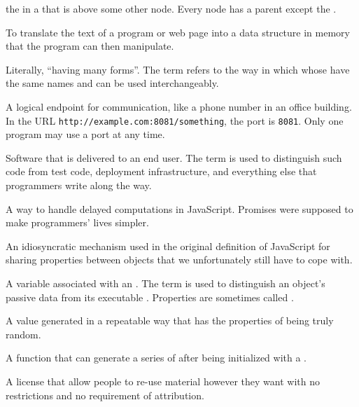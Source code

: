 \begin{description}
the  in a  that is above some other node. Every
node has a parent except the .

To translate the text of a program or web page into a data structure in memory
that the program can then manipulate.

Literally, ``having many forms''. The term refers to the way in which
 whose  have the same names and
 can be used interchangeably.

A logical endpoint for communication, like a phone number in an office
building. In the URL \texttt{http://example.com:8081/something}, the port is \texttt{8081}.
Only one program may use a port at any time.

Software that is delivered to an end user. The term is used to distinguish
such code from test code, deployment infrastructure, and everything else that
programmers write along the way.

A way to handle delayed computations in JavaScript. Promises were supposed to
make programmers' lives simpler.

An idiosyncratic mechanism used in the original definition of JavaScript for
sharing properties between objects that we unfortunately still have to cope
with.

A variable associated with an . The term is used to
distinguish an object's passive data from its executable .
Properties are sometimes called .

A value generated in a repeatable way that has the properties of being truly
random.

A function that can generate a series of  after being initialized with a
.

A license that allow people to re-use material however they want
with no restrictions and no requirement of attribution.


\end{description}
